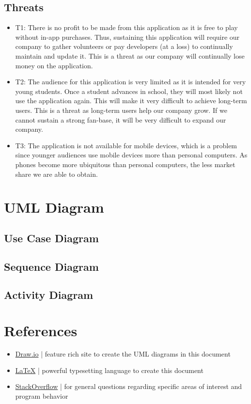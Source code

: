 \documentclass[12pt]{article}
\begin{document}
\subsection{Threats}

\begin{itemize}
\item T1: There is no profit to be made from this application as it is free to play without in-app purchases. Thus, sustaining this application will require our company to gather volunteers or pay developers (at a loss) to continually maintain and update it. This is a threat as our company will continually lose money on the application.
\item T2: The audience for this application is very limited as it is intended for very young students. Once a student advances in school, they will most likely not use the application again. This will make it very difficult to achieve long-term users. This is a threat as long-term users help our company grow. If we cannot sustain a strong fan-base, it will be very difficult to expand our company.  
\item T3: The application is not available for mobile devices, which is a problem since younger audiences use mobile devices more than personal computers. As phones become more ubiquitous than personal computers, the less market share we are able to obtain. 
\end{itemize}

\section{UML Diagram}

\subsection{Use Case Diagram}

\subsection{Sequence Diagram}

\subsection{Activity Diagram}

\section{References}

\begin{itemize}
\item \href{https://app.diagrams.net/}{Draw.io} | feature rich site to create the UML diagrams in this document
\item \href{https://www.latex-project.org/}{\LaTeX} | powerful typesetting language to create this document
\item \href{https://stackoverflow.com/}{StackOverflow} | for general questions regarding specific areas of interest and program behavior
\end{itemize}
\end{document}
